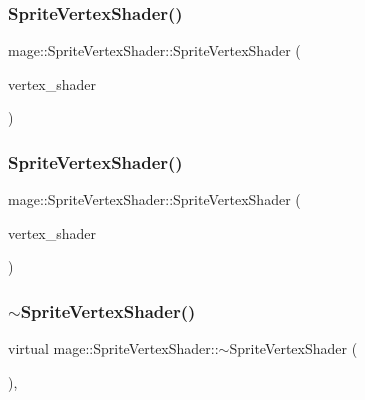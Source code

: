 \subsubsection{\texorpdfstring{Sprite\+Vertex\+Shader()}{SpriteVertexShader()}\hspace{0.1cm}{\footnotesize\ttfamily [2/3]}}
{\footnotesize\ttfamily mage\+::\+Sprite\+Vertex\+Shader\+::\+Sprite\+Vertex\+Shader (\begin{DoxyParamCaption}\item[{const \hyperlink{classmage_1_1_sprite_vertex_shader}{Sprite\+Vertex\+Shader} \&}]{vertex\+\_\+shader }\end{DoxyParamCaption})\hspace{0.3cm}{\ttfamily [delete]}}

\hypertarget{classmage_1_1_sprite_vertex_shader_afb8c1866f6ffdb0fdcd1017591b8c832}{}\label{classmage_1_1_sprite_vertex_shader_afb8c1866f6ffdb0fdcd1017591b8c832} 
\subsubsection{\texorpdfstring{Sprite\+Vertex\+Shader()}{SpriteVertexShader()}\hspace{0.1cm}{\footnotesize\ttfamily [3/3]}}
{\footnotesize\ttfamily mage\+::\+Sprite\+Vertex\+Shader\+::\+Sprite\+Vertex\+Shader (\begin{DoxyParamCaption}\item[{\hyperlink{classmage_1_1_sprite_vertex_shader}{Sprite\+Vertex\+Shader} \&\&}]{vertex\+\_\+shader }\end{DoxyParamCaption})\hspace{0.3cm}{\ttfamily [default]}}

\hypertarget{classmage_1_1_sprite_vertex_shader_a8bed9663e8aac773ed31c58ca6e0d98f}{}\label{classmage_1_1_sprite_vertex_shader_a8bed9663e8aac773ed31c58ca6e0d98f} 
\subsubsection{\texorpdfstring{$\sim$\+Sprite\+Vertex\+Shader()}{~SpriteVertexShader()}}
{\footnotesize\ttfamily virtual mage\+::\+Sprite\+Vertex\+Shader\+::$\sim$\+Sprite\+Vertex\+Shader (\begin{DoxyParamCaption}{ }\end{DoxyParamCaption})\hspace{0.3cm}{\ttfamily [virtual]}, {\ttfamily [default]}}




